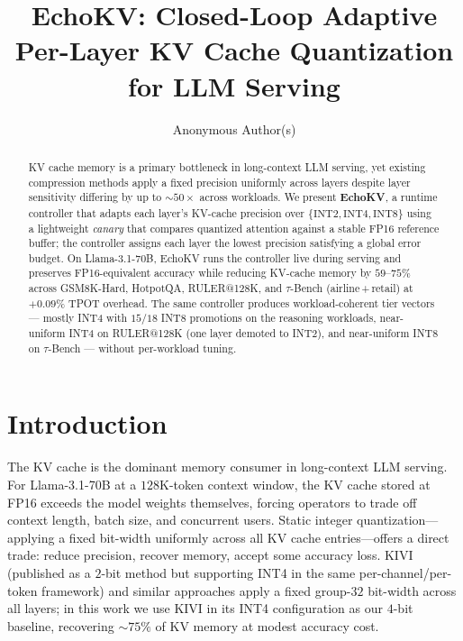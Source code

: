 \documentclass{article}
\title{EchoKV: Closed-Loop Adaptive Per-Layer KV Cache Quantization for LLM Serving}
\author{Anonymous Author(s)}
\begin{document}
\maketitle

\begin{abstract}
KV cache memory is a primary bottleneck in long-context LLM serving, yet
existing compression methods apply a fixed precision uniformly across
layers despite layer sensitivity differing by up to ${\sim}50\times$
across workloads. We present \textbf{EchoKV}, a runtime controller that
adapts each layer's KV-cache precision over $\{\text{INT2}, \text{INT4},
\text{INT8}\}$ using a lightweight \emph{canary} that compares quantized
attention against a stable FP16 reference buffer; the controller assigns
each layer the lowest precision satisfying a global error budget. On
Llama-3.1-70B, EchoKV runs the controller live during serving and
preserves FP16-equivalent accuracy while reducing KV-cache memory by
$59$--$75\%$ across GSM8K-Hard, HotpotQA, RULER@128K, and $\tau$-Bench
(airline\,+\,retail) at $+0.09\%$ TPOT overhead. The same controller
produces workload-coherent tier vectors --- mostly INT4 with $15$/$18$
INT8 promotions on the reasoning workloads, near-uniform INT4 on
RULER@128K (one layer demoted to INT2), and near-uniform INT8 on
$\tau$-Bench --- without per-workload tuning.
\end{abstract}

\section{Introduction}
\label{sec:intro}

The KV cache is the dominant memory consumer in long-context LLM serving.
For Llama-3.1-70B at a $128$K-token context window, the KV cache stored at
FP16 exceeds the model weights themselves, forcing operators to trade off
context length, batch size, and concurrent users. Static integer
quantization---applying a fixed bit-width uniformly across all KV cache
entries---offers a direct trade: reduce precision, recover memory, accept
some accuracy loss. KIVI~\cite{liu2024kivi} (published as a $2$-bit method
but supporting INT4 in the same per-channel/per-token framework) and
similar approaches apply a fixed group-$32$ bit-width across all layers;
in this work we use KIVI in its INT4 configuration as our $4$-bit baseline,
recovering ${\sim}75\%$ of KV memory at modest accuracy cost.
\end{document}
